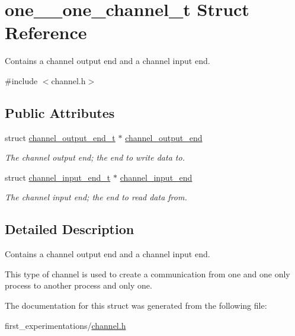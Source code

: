 \hypertarget{structone__2__one__channel__t}{\section{one\-\_\-\_\-one\-\_\-channel\-\_\-t Struct Reference}
\label{structone__2__one__channel__t}
}


Contains a channel output end and a channel input end.  




{\ttfamily \#include $<$channel.\-h$>$}

\subsection*{Public Attributes}
\begin{DoxyCompactItemize}
\item 
\hypertarget{structone__2__one__channel__t_a5d987d14f7b8a8b975c128c0a8d78a63}{struct \hyperlink{structchannel__output__end__t}{channel\-\_\-output\-\_\-end\-\_\-t} $\ast$ \hyperlink{structone__2__one__channel__t_a5d987d14f7b8a8b975c128c0a8d78a63}{channel\-\_\-output\-\_\-end}}\label{structone__2__one__channel__t_a5d987d14f7b8a8b975c128c0a8d78a63}

\begin{DoxyCompactList}\small\item\em The channel output end; the end to write data to. \end{DoxyCompactList}\item 
\hypertarget{structone__2__one__channel__t_aa6fa9e783fe71b03be9586bf19521096}{struct \hyperlink{structchannel__input__end__t}{channel\-\_\-input\-\_\-end\-\_\-t} $\ast$ \hyperlink{structone__2__one__channel__t_aa6fa9e783fe71b03be9586bf19521096}{channel\-\_\-input\-\_\-end}}\label{structone__2__one__channel__t_aa6fa9e783fe71b03be9586bf19521096}

\begin{DoxyCompactList}\small\item\em The channel input end; the end to read data from. \end{DoxyCompactList}\end{DoxyCompactItemize}


\subsection{Detailed Description}
Contains a channel output end and a channel input end. 

This type of channel is used to create a communication from one and one only process to another process and only one. 

The documentation for this struct was generated from the following file\-:\begin{DoxyCompactItemize}
\item 
first\-\_\-experimentations/\hyperlink{channel_8h}{channel.\-h}\end{DoxyCompactItemize}
